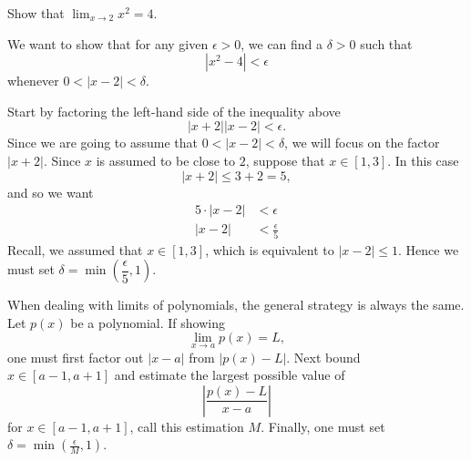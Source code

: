 \documentclass{ximera}
\begin{document}
\begin{example} Show that $\lim_{x\to 2} x^2=4$. 
\begin{explanation}
We want to show that for any given $\epsilon>0$, we can find a
$\delta>0$ such that
\[
|x^2 -4|<\epsilon
\]
whenever $0<|x - 2|<\delta$.
\begin{image}
\end{image}
Start by factoring the left-hand side of
the inequality above
\[
|x+2||x-2|<\epsilon.
\]
Since we are going to assume that $0<|x - 2|<\delta$, we will focus on
the factor $|x+2|$. Since $x$ is assumed to be close to $2$, suppose that $x\in[1,3]$. In this case
\[
|x+2| \le 3+2 = 5,
\]
and so we want
\begin{align*}
5\cdot |x-2| &< \epsilon\\
|x-2| &< \frac{\epsilon}{5}
\end{align*}
Recall, we assumed that $x\in[1,3]$, which is equivalent to
$|x-2|\le 1$. Hence we must set $\delta = \min\left(\dfrac{\epsilon}{5},1\right)$.
\end{explanation}
\end{example}

When dealing with limits of polynomials, the general strategy is
always the same. Let $p(x)$ be a polynomial. If showing
\[
\lim_{x\to a} p(x) = L,
\]
one must first factor out $|x-a|$ from $|p(x) - L|$. Next bound $x\in
[a-1,a+1]$ and estimate the largest possible value of
\[
\left|\frac{p(x) -L}{x-a}\right|
\]
for $x\in[a-1,a+1]$, call this estimation $M$. Finally, one must set
$\delta = \min\left(\frac{\epsilon}{M}, 1\right)$.
\end{document}
